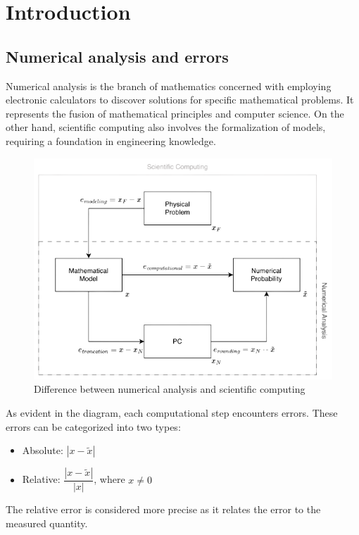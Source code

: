 \documentclass[12pt, a4paper]{report}
\begin{document}
\cleardoublepage
{}

\tableofcontents

\cleardoublepage
{}

\chapter{Introduction}
    \section{Numerical analysis and errors}
    Numerical analysis is the branch of mathematics concerned with employing electronic calculators to discover solutions for specific mathematical problems. 
    It represents the fusion of mathematical principles and computer science.
    On the other hand, scientific computing also involves the formalization of models, requiring a foundation in engineering knowledge.
    \begin{figure}[H]
        \centering
        \includegraphics[width=0.75\linewidth]{images/difference.png}
        \caption{Difference between numerical analysis and scientific computing}
    \end{figure}
    As evident in the diagram, each computational step encounters errors. These errors can be categorized into two types:
    \begin{itemize}
        \item Absolute: $\left\lvert x - \tilde{x} \right\rvert$
        \item Relative: $\dfrac{\left\lvert x - \tilde{x} \right\rvert}{\left\lvert x \right\rvert}$, where $x \neq 0$
    \end{itemize}
    The relative error is considered more precise as it relates the error to the measured quantity.
\end{document}
